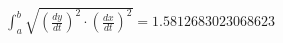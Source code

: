 \documentclass[preview]{standalone}
\begin{document}
\begin{align*}
\int_{a}^{b} \sqrt{\left(\frac{dy}{dt}\right)^2 \cdot \left(\frac{dx}{dt}\right)^2} = 1.5812683023068623
\end{align*}
\end{document}
